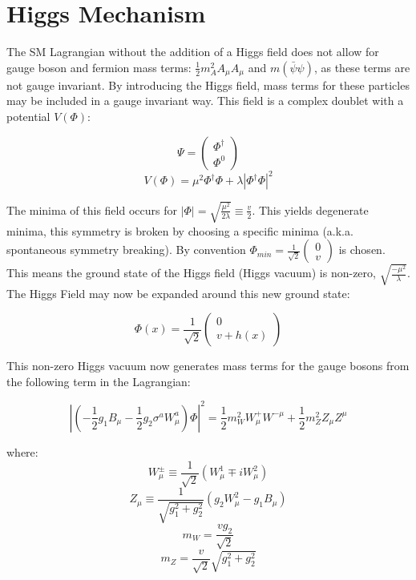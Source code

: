\section{Higgs Mechanism}
The SM Lagrangian without the addition of a Higgs field does not allow for gauge boson and fermion mass terms: $\frac{1}{2}m_{A}^{2}A_{\mu}A_{\mu}$ and $m(\bar{\psi}\psi)$,  as these terms are not gauge invariant. By introducing the Higgs field, mass terms for these particles may be included in a gauge invariant way. This field is a complex doublet with a potential $V(\Phi)$:

\begin{equation}
\Psi = \begin{pmatrix} \Phi^{\dagger} \\ \Phi^{0} \end{pmatrix}
\end{equation}
\begin{equation}
V(\Phi)=\mu^{2}\Phi^{\dagger}\Phi + \lambda |\Phi^{\dagger}\Phi|^{2}
\end{equation}

The minima of this field occurs for $|\Phi|= \sqrt{\frac{\mu^{2}}{2\lambda}} \equiv \frac{v}{2}$. This yields degenerate minima, this symmetry is broken by choosing a specific minima (a.k.a. spontaneous symmetry breaking). By convention  $\Phi_{min} = \frac{1}{\sqrt{2}}\begin{pmatrix}0 \\ v \end{pmatrix}$ is chosen. This means the ground state of the Higgs field (Higgs vacuum) is non-zero, $\sqrt{\frac{-\mu^{2}}{\lambda}}$. The Higgs Field may now be expanded around this new ground state:

\begin{equation}
\Phi(x)=\frac{1}{\sqrt{2}}\begin{pmatrix} 0 \\ v+h(x)\end{pmatrix}
\end{equation}

This non-zero Higgs vacuum now generates mass terms for the gauge bosons from the following term in the Lagrangian:

\begin{equation}
|(-\frac{1}{2}g_{1}B_{\mu}-\frac{1}{2}g_{2}\sigma^{a}W_{\mu}^{a})\Phi|^{2}=\frac{1}{2}m_{W}^{2}W_{\mu}^{+}W^{-\mu}+\frac{1}{2}m_{Z}^{2}Z_{\mu}Z^{\mu}
\end{equation}

where:
\begin{equation}
W^{\pm}_{\mu} \equiv \frac{1}{\sqrt{2}}(W^{1}_{\mu} \mp iW^{2}_{\mu})
\end{equation}
\begin{equation}
Z_{\mu} \equiv \frac{1}{\sqrt{g_{1}^{2}+g_{2}^{2}}}(g_{2}W^{2}_{\mu}-g_{1}B_{\mu})
\end{equation}
\begin{equation}
m_{W} = \frac{vg_{2}}{\sqrt{2}}
\end{equation}
\begin{equation}
m_{Z} = \frac{v}{\sqrt{2}}\sqrt{g_{1}^{2} + g_{2}^{2}}
\end{equation}

